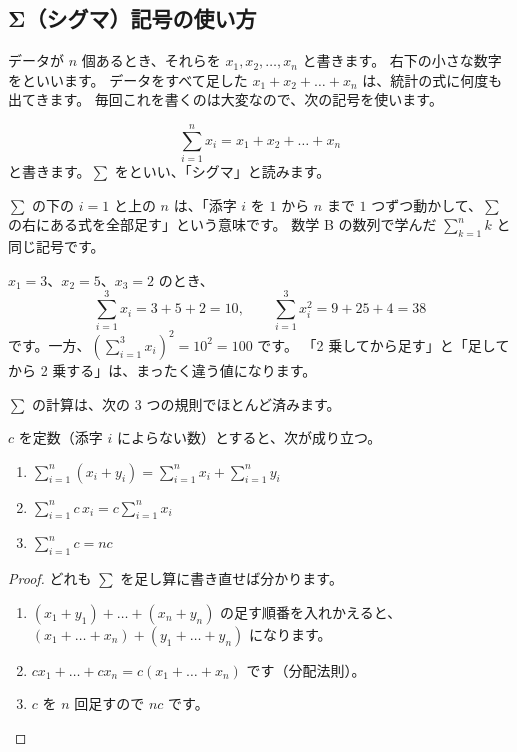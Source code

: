 \subsection{Σ（シグマ）記号の使い方}

データが $n$ 個あるとき、それらを $x_1, x_2, \dots, x_n$ と書きます。
右下の小さな数字をといいます。
データをすべて足した $x_1 + x_2 + \dots + x_n$ は、統計の式に何度も出てきます。
毎回これを書くのは大変なので、次の記号を使います。

\begin{definition}
  \[
    \sum_{i=1}^{n} x_i = x_1 + x_2 + \dots + x_n
  \]
  と書きます。$\sum$ をといい、「シグマ」と読みます。
\end{definition}

$\sum$ の下の $i=1$ と上の $n$ は、「添字 $i$ を $1$ から $n$ まで $1$ つずつ動かして、$\sum$ の右にある式を全部足す」という意味です。
数学 B の数列で学んだ $\sum_{k=1}^{n} k$ と同じ記号です。

\begin{example}[Σ 記号の計算][ex:sigma]
  $x_1 = 3$、$x_2 = 5$、$x_3 = 2$ のとき、
  \[
    \sum_{i=1}^{3} x_i = 3 + 5 + 2 = 10, \qquad
    \sum_{i=1}^{3} x_i^2 = 9 + 25 + 4 = 38
  \]
  です。一方、$\left(\sum_{i=1}^{3} x_i\right)^2 = 10^2 = 100$ です。
  「2 乗してから足す」と「足してから 2 乗する」は、まったく違う値になります。
\end{example}

$\sum$ の計算は、次の 3 つの規則でほとんど済みます。

\begin{theorem}
  $c$ を定数（添字 $i$ によらない数）とすると、次が成り立つ。
  \begin{enumerate}
    \item $\displaystyle \sum_{i=1}^{n} (x_i + y_i) = \sum_{i=1}^{n} x_i + \sum_{i=1}^{n} y_i$
    \item $\displaystyle \sum_{i=1}^{n} c\,x_i = c \sum_{i=1}^{n} x_i$
    \item $\displaystyle \sum_{i=1}^{n} c = nc$
  \end{enumerate}
\end{theorem}

\begin{proof}
  どれも $\sum$ を足し算に書き直せば分かります。
  \begin{enumerate}
    \item $(x_1 + y_1) + \dots + (x_n + y_n)$ の足す順番を入れかえると、$(x_1 + \dots + x_n) + (y_1 + \dots + y_n)$ になります。
    \item $c x_1 + \dots + c x_n = c (x_1 + \dots + x_n)$ です（分配法則）。
    \item $c$ を $n$ 回足すので $nc$ です。\qedhere
  \end{enumerate}
\end{proof}

